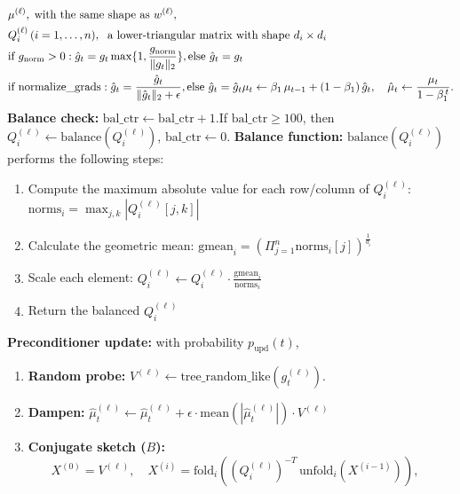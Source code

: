 \begin{algorithm}[H]
\begin{tcolorbox}
  \begin{align*}
    &\mu^{(\ell)}, \; \text{with the same shape as } w^{(\ell)}, \\
    &Q_i^{(\ell)}\,(i=1,\dots,n), \; \text{ a lower-triangular matrix with shape } d_i \times d_i\\ 
        &\text{if }g_{\mathrm{norm}} > 0: 
           \hat g_t = g_t \max\{1, \frac{g_{\mathrm{norm}}}{\|g_t\|_2}\}, \text{else } \hat g_t = g_t\\
        &\text{if }\mathrm{normalize\_grads}: 
           \hat g_t = \frac{\hat g_t}{\|\hat g_t\|_2 + \epsilon}, \text{else } \hat g_t = \hat g_t
        \mu_t \leftarrow \beta_{1}\,\mu_{t-1} + (1-\beta_{1})\,\hat g_t,\quad
        \hat\mu_t \leftarrow \frac{\mu_t}{1-\beta_{1}^{\,t}}.
      \end{align*}
     \textbf{Balance check:}  $\mathrm{bal\_ctr}\leftarrow \mathrm{bal\_ctr}+1$.If $\mathrm{bal\_ctr}\ge100$, then 
          $Q_i^{(\ell)}\leftarrow \mathrm{balance}(Q_i^{(\ell)})$, 
          $\mathrm{bal\_ctr}\leftarrow0$.
          \textbf{Balance function:} $\mathrm{balance}(Q_i^{(\ell)})$ performs the following steps:
          \begin{enumerate}[left=1em]
            \item Compute the maximum absolute value for each row/column of $Q_i^{(\ell)}$: $\text{norms}_i = \max_{j,k} |Q_i^{(\ell)}[j,k]|$
            \item Calculate the geometric mean: $\text{gmean}_i = (\Pi_{j=1}^{n} \text{norms}_i[j])^{\frac{1}{d_i}}$
            \item Scale each element: $Q_i^{(\ell)} \leftarrow Q_i^{(\ell)} \cdot \frac{\text{gmean}_i}{\text{norms}_i}$
            \item Return the balanced $Q_i^{(\ell)}$
          \end{enumerate}
      \textbf{Preconditioner update:} with probability $p_{\mathrm{upd}}(t)$,
      \begin{enumerate}[left=1em]
        \item \textbf{Random probe:} 
          $V^{(\ell)}\leftarrow \mathrm{tree\_random\_like}(g_t^{(\ell)})$.
        \item \textbf{Dampen:}
          $\hat\mu_t^{(\ell)} \leftarrow \hat\mu_t^{(\ell)} + \epsilon \cdot \mathrm{mean}(|\hat\mu_t^{(\ell)}|)\cdot V^{(\ell)}$
        \item \textbf{Conjugate sketch ($B$):}
          \[
            X^{(0)}=V^{(\ell)},\quad
            X^{(i)}=\text{fold}_i\left(\left(Q_i^{(\ell)}\right)^{-T}\,\text{unfold}_i(X^{(i-1)})\right) ,\quad
\]
\end{enumerate}
\end{tcolorbox}
\end{algorithm}
